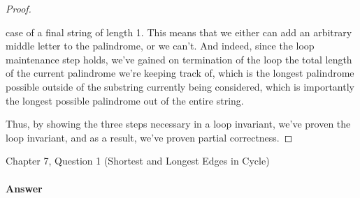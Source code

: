 \documentclass{article}
\begin{document}
\begin{enumerate}
\begin{proof}
\begin{enumerate}
					case of a final string of length 1. This means that we either can add an arbitrary middle letter to
					the palindrome, or we can't. And indeed, since the loop maintenance step holds, we've gained on
					termination of the loop the total length of the current palindrome we're keeping track of, which is
					the longest palindrome possible outside of the substring currently being considered, which is
					importantly the longest possible palindrome out of the entire string.
			\end{enumerate}
			Thus, by showing the three steps necessary in a loop invariant, we've proven the loop invariant, and as a result,
			we've proven partial correctness.
		\end{proof}
 
		
\end{enumerate}


\nextprob
{}

Chapter 7, Question 1 (Shortest and Longest Edges in Cycle)

\paragraph{Answer}

\end{document}
